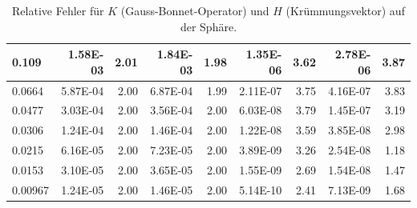 \begin{table}[htbp]
\begin{tabular}{|l|r|r|r|r|r|r|r|r|}
            0.109 & 1.58E-03 & 2.01 & 1.84E-03 & 1.98 & 1.35E-06 & 3.62 & 2.78E-06 & 3.87 \\ \hline
            0.0664 & 5.87E-04 & 2.00 & 6.87E-04 & 1.99 & 2.11E-07 & 3.75 & 4.16E-07 & 3.83 \\ \hline
            0.0477 & 3.03E-04 & 2.00 & 3.56E-04 & 2.00 & 6.03E-08 & 3.79 & 1.45E-07 & 3.19 \\ \hline
            0.0306 & 1.24E-04 & 2.00 & 1.46E-04 & 2.00 & 1.22E-08 & 3.59 & 3.85E-08 & 2.98 \\ \hline
            0.0215 & 6.16E-05 & 2.00 & 7.23E-05 & 2.00 & 3.89E-09 & 3.26 & 2.54E-08 & 1.18 \\ \hline
            0.0153 & 3.10E-05 & 2.00 & 3.65E-05 & 2.00 & 1.55E-09 & 2.69 & 1.54E-08 & 1.47 \\ \hline
            0.00967 & 1.24E-05 & 2.00 & 1.46E-05 & 2.00 & 5.14E-10 & 2.41 & 7.13E-09 & 1.68 \\ \hline
      \end{tabular}
      \caption[Gauß-Bonnet und Krümmungsvektor auf der Sphäre]{Relative Fehler für \( K \) (Gauss-Bonnet-Operator) und \( H \) (Krümmungsvektor) auf der Sphäre.}
      \label{tabSphereGBLX}
   \end{table}

